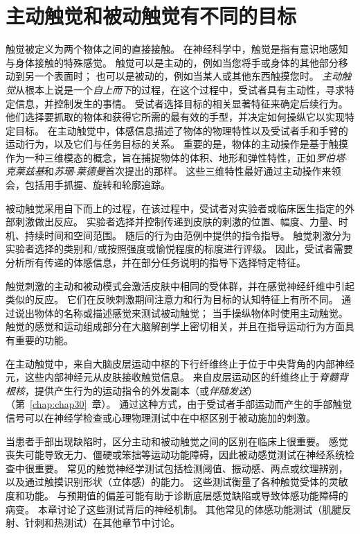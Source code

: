 \section{主动触觉和被动触觉有不同的目标}

触觉被定义为两个物体之间的直接接触。
在神经科学中，触觉是指有意识地感知与身体接触的特殊感觉。
触觉可以是主动的，例如当您将手或身体的其他部分移动到另一个表面时；
也可以是被动的，例如当某人或其他东西触摸您时。
\textit{主动触觉}从根本上说是一个\textit{自上而下}的过程，在这个过程中，受试者具有主动性，寻求特定信息，并控制发生的事情。
受试者选择目标的相关显著特征来确定后续行为。
他们选择要抓取的物体和获得它所需的最有效的手型，并决定如何操纵它以实现特定目标。
在主动触觉中，体感信息描述了物体的物理特性以及受试者手和手臂的运动行为，以及它们与任务目标的关系。
重要的是，物体的主动操作是基于触摸作为一种三维模态的概念，旨在捕捉物体的体积、地形和弹性特性，正如\textit{罗伯塔$\cdot$克莱兹基}和\textit{苏珊$\cdot$莱德曼}首次提出的那样。
这些三维特性最好通过主动操作来领会，包括用手抓握、旋转和轮廓追踪。


被动触觉采用自下而上的过程，在该过程中，受试者对实验者或临床医生指定的外部刺激做出反应。
实验者选择并控制传递到皮肤的刺激的位置、幅度、力量、时机、持续时间和空间范围。
随后的行为由范例中提供的指令指导。
触觉刺激分为实验者选择的类别和/或按照强度或愉悦程度的标度进行评级。
因此，受试者需要分析所有传递的体感信息，并在部分任务说明的指导下选择特定特征。


触觉刺激的主动和被动模式会激活皮肤中相同的受体群，并在感觉神经纤维中引起类似的反应。
它们在反映刺激期间注意力和行为目标的认知特征上有所不同。
通过说出物体的名称或描述感觉来测试被动触觉；
当手操纵物体时使用主动触觉。
触觉的感觉和运动组成部分在大脑解剖学上密切相关，并且在指导运动行为方面具有重要的功能。


在主动触觉中，来自大脑皮层运动中枢的下行纤维终止于位于中央背角的内部神经元，这些内部神经元从皮肤接收触觉信息。
来自皮层运动区的纤维终止于\textit{脊髓背根核}，提供产生行为的运动指令的外发副本（或\textit{伴随发送}）（第~\ref{chap:chap30}~章）。
通过这种方式，由于受试者手部运动而产生的手部触觉信号可以在神经学检查或心理物理测试中在中枢区别于被动施加的刺激。


当患者手部出现缺陷时，区分主动和被动触觉之间的区别在临床上很重要。
感觉丧失可能导致无力、僵硬或笨拙等运动功能障碍，因此被动感觉测试在神经系统检查中很重要。
常见的触觉神经学测试包括检测阈值、振动感、两点或纹理辨别，以及通过触摸识别形状（立体感）的能力。 
这些测试衡量了各种触觉受体的灵敏度和功能。
与预期值的偏差可能有助于诊断底层感觉缺陷或导致体感功能障碍的病变。
本章讨论了这些测试背后的神经机制。
其他常见的体感功能测试（肌腱反射、针刺和热测试）在其他章节中讨论。



